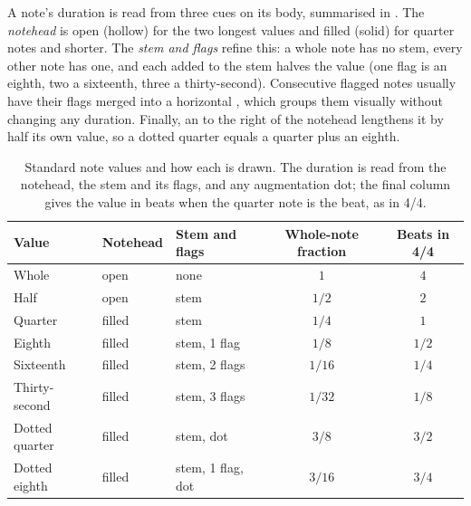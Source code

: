 A note's duration is read from three cues on its body, summarised in
.
The \emph{notehead} is open (hollow) for the two longest values and filled (solid) for
quarter notes and shorter.
The \emph{stem and flags} refine this: a whole note has no stem, every other note has one,
and each  added to the stem halves the value (one flag is an eighth, two a
sixteenth, three a thirty-second).
Consecutive flagged notes usually have their flags merged into a horizontal ,
which groups them visually without changing any duration.
Finally, an  to the right of the notehead lengthens it by half its
own value, so a dotted quarter equals a quarter plus an eighth.

\begin{table}[htbp]
    \centering
    \caption{Standard note values and how each is drawn.
    The duration is read from the notehead, the stem and its flags, and any augmentation
    dot; the final column gives the value in beats when the quarter note is the beat, as
    in 4/4.}
    \label{tab:note-durations}
    \small
    \setlength{\tabcolsep}{8pt}
    \renewcommand{\arraystretch}{1.2}
    \begin{tabular}{@{} l l l c c @{}}
        \toprule
        \textbf{Value} & \textbf{Notehead} & \textbf{Stem and flags} &
        \textbf{Whole-note fraction} & \textbf{Beats in 4/4} \\
        \midrule
        Whole         & open   & none              & \(1\)    & \(4\)   \\
        Half          & open   & stem              & \(1/2\)  & \(2\)   \\
        Quarter       & filled & stem              & \(1/4\)  & \(1\)   \\
        Eighth        & filled & stem, 1 flag      & \(1/8\)  & \(1/2\) \\
        Sixteenth     & filled & stem, 2 flags     & \(1/16\) & \(1/4\) \\
        Thirty-second & filled & stem, 3 flags     & \(1/32\) & \(1/8\) \\
        \addlinespace
        Dotted quarter & filled & stem, dot           & \(3/8\)  & \(3/2\) \\
        Dotted eighth  & filled & stem, 1 flag, dot   & \(3/16\) & \(3/4\) \\
        \bottomrule
    \end{tabular}
\end{table}

